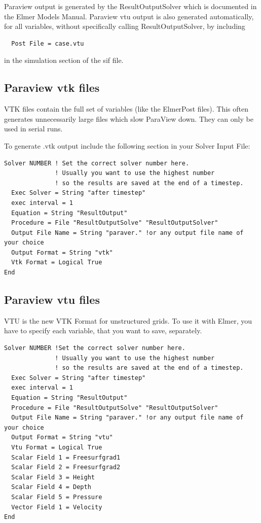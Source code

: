 Paraview output is generated by the ResultOutputSolver which is documented in the Elmer Models Manual.  Paraview vtu output is also generated automatically, for all variables, without specifically calling ResultOutputSolver, by including 

\begin{verbatim}
  Post File = case.vtu
\end{verbatim}
 \noindent in the simulation section of the sif file.

\subsection{Paraview vtk files}

VTK files contain the full set of variables (like the ElmerPost files). This often generates unnecessarily large files which slow ParaView down. They can only be used in serial runs.

To generate .vtk output include the following section in your Solver Input File:

\begin{verbatim}
Solver NUMBER ! Set the correct solver number here.
              ! Usually you want to use the highest number
              ! so the results are saved at the end of a timestep.
  Exec Solver = String "after timestep"	
  exec interval = 1
  Equation = String "ResultOutput"
  Procedure = File "ResultOutputSolve" "ResultOutputSolver"
  Output File Name = String "paraver." !or any output file name of your choice
  Output Format = String "vtk"
  Vtk Format = Logical True
End
\end{verbatim}


\subsection{Paraview vtu files}

VTU is the new VTK Format for unstructured grids. To use it with Elmer, you have to specify each variable, that you want to save, separately.

\begin{verbatim}
Solver NUMBER !Set the correct solver number here.
              ! Usually you want to use the highest number 
              ! so the results are saved at the end of a timestep.
  Exec Solver = String "after timestep"	
  exec interval = 1
  Equation = String "ResultOutput"
  Procedure = File "ResultOutputSolve" "ResultOutputSolver"
  Output File Name = String "paraver." !or any output file name of your choice
  Output Format = String "vtu"
  Vtu Format = Logical True
  Scalar Field 1 = Freesurfgrad1
  Scalar Field 2 = Freesurfgrad2
  Scalar Field 3 = Height
  Scalar Field 4 = Depth
  Scalar Field 5 = Pressure
  Vector Field 1 = Velocity
End
\end{verbatim}

